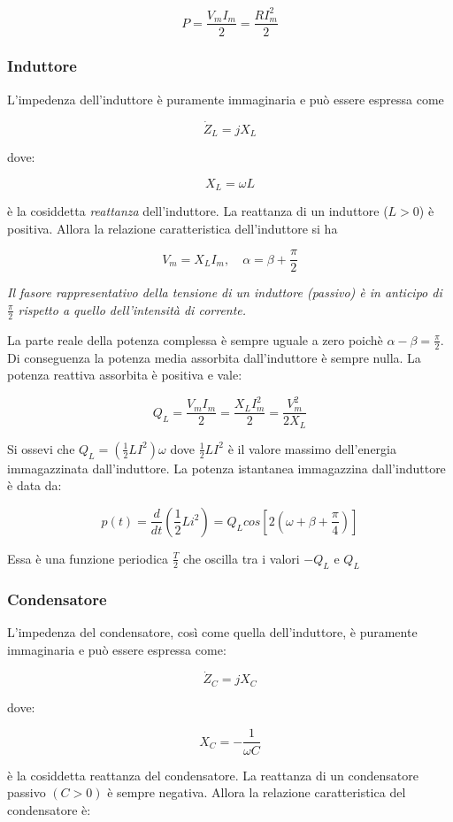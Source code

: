 \documentclass[a4paper]{report}
\begin{document}
\[
P = \dfrac{V_mI_m}{2}=\dfrac{RI^2_m}{2}
\] 

\subsubsection{Induttore}
L'impedenza dell'induttore \`e puramente immaginaria e pu\`o essere espressa come

\[
\dot Z_L = jX_L
\]

dove:

\[
X_L=\omega L
\] 

\`e la cosiddetta \emph{reattanza} dell'induttore. La reattanza di un induttore ($L>0$)
\`e positiva. Allora la relazione caratteristica dell'induttore si ha

\[
V_m=X_LI_m, \quad \alpha=\beta+\dfrac{\pi}{2}
\]

\emph{Il fasore rappresentativo della tensione di un induttore (passivo) \`e in anticipo di 
$\frac{\pi}{2}$ rispetto a quello dell'intensit\`a di corrente.}

La parte reale della potenza complessa \`e sempre uguale a zero poich\`e 
$\alpha-\beta=\frac{\pi}{2}$. Di conseguenza la potenza media assorbita dall'induttore 
\`e sempre nulla. La potenza reattiva assorbita \`e positiva e vale:

\[
Q_L=\dfrac{V_mI_m}{2}=\dfrac{X_LI^2_m}{2}=\dfrac{V^2_m}{2X_L}
\]

Si ossevi che $Q_L=\left(\frac{1}{2}LI^2\right) \omega$ dove $\frac{1}{2}LI^2$ 
\`e il valore massimo dell'energia immagazzinata dall'induttore.
La potenza istantanea immagazzina dall'induttore \`e data da:

\[
p(t)=\dfrac{d}{dt}\left(\dfrac{1}{2}Li^2\right)=Q_Lcos\left[2\left(\omega+\beta+\dfrac{\pi}{4}\right)\right] 
\]

Essa \`e una funzione periodica $\frac{T}{2}$ che oscilla tra i valori $-Q_L$ e $Q_L$

\subsubsection{Condensatore}

L'impedenza del condensatore, cos\`i come quella dell'induttore, \`e puramente
immaginaria e pu\`o essere espressa come:

\[
\dot Z_C=jX_C
\]

dove:

\[
X_C=-\dfrac{1}{\omega C}
\]

\`e la cosiddetta reattanza del condensatore. La reattanza di un condensatore
passivo $(C>0)$ \`e sempre negativa. Allora la relazione caratteristica del 
condensatore \`e:
\end{document}
